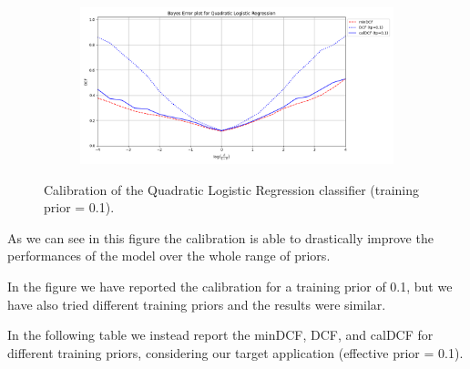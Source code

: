 \documentclass[12pt]{report}
\newcommand{\nnl}{%
    \newline
    \newline
}
\newcommand{\nl}{%
    \newline
    \noindent
}
\begin{document}
\begin{figure}[H]
    \centering
    \begin{subfigure}[t]{0.6\textwidth}
        \includegraphics[width=\textwidth]{./plot/calibration/QLR.png}
    \end{subfigure}
    \caption{Calibration of the Quadratic Logistic Regression classifier (training prior = 0.1).}
    \label{fig:calibration_QLR}
\end{figure}
\noindent
As we can see in this figure the calibration is able to drastically improve the performances of the model over the whole range of priors.
\nl
In the figure we have reported the calibration for a training prior of 0.1, but we have also tried different training priors and the results were similar.
\nnl
In the following table we instead report the minDCF, DCF, and calDCF for different training priors, considering our target application (effective prior = 0.1).
\end{document}
